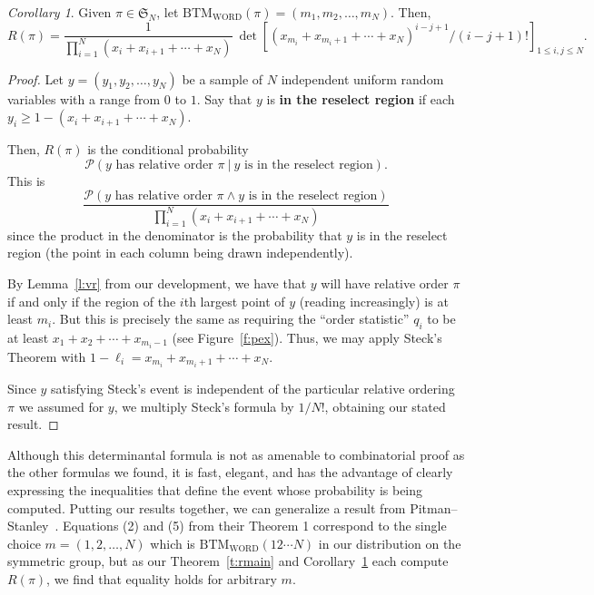 \documentclass[11pt]{amsart}   %
\theoremstyle{definition}
\theoremstyle{remark}
\numberwithin{equation}{section}
\theoremstyle{theorem}
\newtheorem{corollary}[theorem]{Corollary}
\renewcommand{\S}{\mathcal{S}}
\renewcommand{\S}{\mathfrak{S}}
\renewcommand{\P}[0]{\mathcal{P}}
\newcommand{\BTMW}{\mathrm{BTM_{WORD}}}
\begin{document}
\begin{corollary}\label{c:rmain}
Given $\pi \in \S_N$, let $\BTMW(\pi) = (m_1, m_2, \ldots, m_N)$.
Then, 
\[ R(\pi) =  \frac{1}{\prod_{i=1}^N (x_i + x_{i+1} + \cdots + x_N)} \ \det\left[  (x_{m_i} + x_{m_i+1} + \cdots + x_N)^{i-j+1} / (i-j+1)!  \right]_{1 \leq i,j \leq N}. \]
\end{corollary}
\begin{proof}
    Let $y = (y_1, y_2, \ldots, y_N)$ be a sample of $N$ independent uniform random variables with a range from $0$ to $1$.  Say that $y$ is {\bf in the reselect region} if each $y_i \geq 1 - (x_i + x_{i+1} + \cdots + x_N)$.

Then, $R(\pi)$ is the conditional probability 
\[ \P(y \text{ has relative order $\pi$} \ |\  y \text{ is in the reselect region}). \]
This is
\[ \frac{\P(y \text{ has relative order $\pi$} \land y \text{ is in the reselect region})}{\prod_{i=1}^N (x_i + x_{i+1} + \cdots + x_N)} \]
since the product in the denominator is the probability that $y$ is in the reselect region (the point in each column being drawn independently).

By Lemma~\ref{l:vr} from our development, we have that $y$ will have relative order $\pi$ if and only if the region of the $i$th largest point of $y$ (reading increasingly) is at least $m_i$.  But this is precisely the same as requiring the ``order statistic'' $q_i$ to be at least $x_1+x_2+\cdots+x_{m_{i}-1}$ (see Figure~\ref{f:pex}).  Thus, we may apply Steck's Theorem with $1 - \ell_i = x_{m_i} + x_{m_i + 1} + \cdots + x_N$.

Since $y$ satisfying Steck's event is independent of the particular relative ordering $\pi$ we assumed for $y$, we multiply Steck's formula by $1/N!$, obtaining our stated result.
\end{proof}

Although this determinantal formula is not as amenable to combinatorial proof as the other formulas we found, it is fast, elegant, and has the advantage of clearly expressing the inequalities that define the event whose probability is being computed.  Putting our results together, we can generalize a result from Pitman--Stanley~\cite{pitman--stanley}.  Equations (2) and (5) from their Theorem 1 correspond to the single choice $m = (1, 2, \ldots, N)$ which is $\BTMW(12\cdots N)$ in our distribution on the symmetric group, but as our Theorem~\ref{t:rmain} and Corollary~\ref{c:rmain} each compute $R(\pi)$, we find that equality holds for arbitrary $m$.
\end{document}
